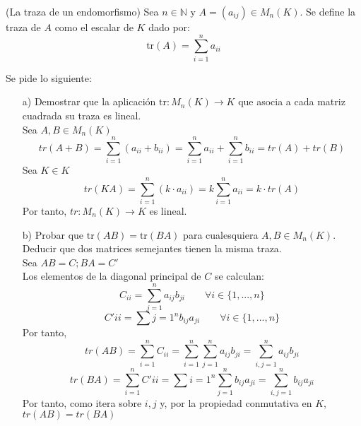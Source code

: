 \begin{ejercicio}
    (La traza de un endomorfismo) Sea $n \in \mathbb{N}$ y $A = (a_{ij}) \in M_n(K)$. Se define la traza de $A$ como el escalar de $K$ dado por:
    $$\text{tr}(A) = \sum_{i=1}^n a_{ii}$$
    
    Se pide lo siguiente:
    \begin{itemize}
        \item[a)] Demostrar que la aplicación $\text{tr}: M_n(K) \rightarrow K$ que asocia a cada matriz cuadrada su traza es lineal.\\
        Sea $A,B \in M_n(K)$
        \begin{equation*}
            tr(A+B) = \sum_{i=1}^n (a_{ii}+b_{ii}) = \sum_{i=1}^n a_{ii} + \sum_{i=1}^n b_{ii} = tr(A) + tr(B)
        \end{equation*}	
        Sea $K\in K$
        \begin{equation*}
            tr(KA) = \sum_{i=1}^n (k\cdot a_{ii}) = k\sum_{i=1}^n a_{ii} = k\cdot tr(A)
        \end{equation*}
        Por tanto, $tr: M_n(K) \rightarrow K$ es lineal.
        \item[b)] Probar que $\text{tr}(AB) = \text{tr}(BA)$ para cualesquiera $A, B \in M_n(K)$. Deducir que dos matrices semejantes tienen la misma traza.\\
        Sea $AB=C; BA=C'$\\
        Los elementos de la diagonal principal de $C$ se calculan:
        \begin{equation*}
            C_{ii}=\sum_{j=1}^n a_{ij}b_{ji} \qquad \forall i \in \{1,...,n\}
        \end{equation*}
        \begin{equation*}
            C'{ii}=\sum{j=1}^n b_{ij}a_{ji} \qquad \forall i \in \{1,...,n\}
        \end{equation*}
        Por tanto,
        \begin{equation*}
            tr(AB)=\sum_{i=1}^{n}C_{ii}=\sum_{i=1}^{n}\sum_{j=1}^{n}a_{ij}b_{ji}=\sum_{i,j=1}^{n}a_{ij}b_{ji}
        \end{equation*}
        \begin{equation*}
            tr(BA)=\sum_{i=1}^{n}C'{ii}=\sum{i=1}^{n}\sum_{j=1}^{n}b_{ij}a_{ji}=\sum_{i,j=1}^{n}b_{ij}a_{ji}
        \end{equation*}
        Por tanto, como itera sobre $i,j$ y, por la propiedad conmutativa en $K$,\\
        $tr(AB)=tr(BA)$\\ \\

\end{itemize}
\end{ejercicio}
